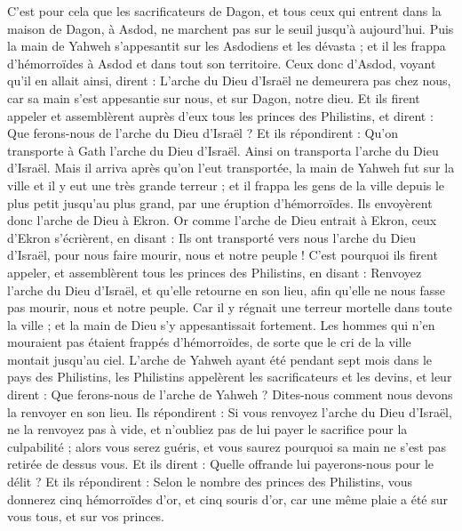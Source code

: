 \begin{multicols}{2}
C'est pour cela que les sacrificateurs de Dagon, et tous ceux qui entrent dans la maison de Dagon, à Asdod, ne marchent pas sur le seuil jusqu'à aujourd'hui.
Puis la main de Yahweh s'appesantit sur les Asdodiens et les dévasta ; et il les frappa d'hémorroïdes à Asdod et dans tout son territoire.
Ceux donc d'Asdod, voyant qu'il en allait ainsi, dirent : L'arche du Dieu d'Israël ne demeurera pas chez nous, car sa main s'est appesantie sur nous, et sur Dagon, notre dieu.
Et ils firent appeler et assemblèrent auprès d'eux tous les princes des Philistins, et dirent : Que ferons-nous de l'arche du Dieu d'Israël ? Et ils répondirent : Qu'on transporte à Gath l'arche du Dieu d'Israël. Ainsi on transporta l'arche du Dieu d'Israël.
Mais il arriva après qu'on l'eut transportée, la main de Yahweh fut sur la ville et il y eut une très grande terreur ; et il frappa les gens de la ville depuis le plus petit jusqu'au plus grand, par une éruption d'hémorroïdes.
Ils envoyèrent donc l'arche de Dieu à Ekron. Or comme l'arche de Dieu entrait à Ekron, ceux d'Ekron s'écrièrent, en disant : Ils ont transporté vers nous l'arche du Dieu d'Israël, pour nous faire mourir, nous et notre peuple !
C'est pourquoi ils firent appeler, et assemblèrent tous les princes des Philistins, en disant : Renvoyez l'arche du Dieu d'Israël, et qu'elle retourne en son lieu, afin qu'elle ne nous fasse pas mourir, nous et notre peuple. Car il y régnait une terreur mortelle dans toute la ville ; et la main de Dieu s'y appesantissait fortement.
Les hommes qui n'en mouraient pas étaient frappés d'hémorroïdes, de sorte que le cri de la ville montait jusqu'au ciel.
\VerseOne{}L'arche de Yahweh ayant été pendant sept mois dans le pays des Philistins,
les Philistins appelèrent les sacrificateurs et les devins, et leur dirent : Que ferons-nous de l'arche de Yahweh ? Dites-nous comment nous devons la renvoyer en son lieu.
Ils répondirent : Si vous renvoyez l'arche du Dieu d'Israël, ne la renvoyez pas à vide, et n'oubliez pas de lui payer le sacrifice pour la culpabilité ; alors vous serez guéris, et vous saurez pourquoi sa main ne s'est pas retirée de dessus vous.
Et ils dirent : Quelle offrande lui payerons-nous pour le délit ? Et ils répondirent : Selon le nombre des princes des Philistins, vous donnerez cinq hémorroïdes d'or, et cinq souris d'or, car une même plaie a été sur vous tous, et sur vos princes.

\end{multicols}

